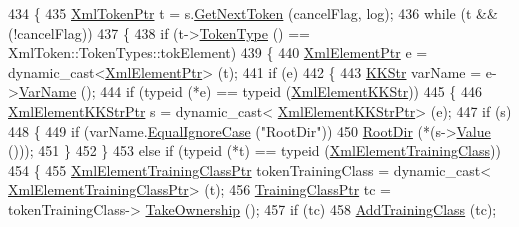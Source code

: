 \begin{DoxyCode}
434 \{
435   \hyperlink{class_k_k_b_1_1_xml_token}{XmlTokenPtr} t = s.\hyperlink{class_k_k_b_1_1_xml_stream_a87cc738b05c666cf5d5c25beaab477b4}{GetNextToken} (cancelFlag, log);
436   \textcolor{keywordflow}{while}  (t  &&  (!cancelFlag))
437   \{
438     \textcolor{keywordflow}{if}  (t->\hyperlink{class_k_k_b_1_1_xml_token_ae98e2c1a798882647578cae4adcd7176}{TokenType} () == XmlToken::TokenTypes::tokElement)
439     \{
440       \hyperlink{class_k_k_b_1_1_xml_element}{XmlElementPtr} e = \textcolor{keyword}{dynamic\_cast<}\hyperlink{class_k_k_b_1_1_xml_element}{XmlElementPtr}\textcolor{keyword}{>} (t);
441       \textcolor{keywordflow}{if}  (e)
442       \{
443         \hyperlink{class_k_k_b_1_1_k_k_str}{KKStr} varName = e->\hyperlink{class_k_k_b_1_1_xml_element_aef57cf00be66a3a387ce849b35125f51}{VarName} ();
444         \textcolor{keywordflow}{if}  (\textcolor{keyword}{typeid} (*e) == \textcolor{keyword}{typeid} (\hyperlink{class_k_k_b_1_1_xml_element_k_k_str}{XmlElementKKStr}))
445         \{
446           \hyperlink{class_k_k_b_1_1_xml_element_k_k_str}{XmlElementKKStrPtr}  s = \textcolor{keyword}{dynamic\_cast<}
      \hyperlink{class_k_k_b_1_1_xml_element_k_k_str}{XmlElementKKStrPtr}\textcolor{keyword}{>} (e);
447           \textcolor{keywordflow}{if}  (s)
448           \{
449             \textcolor{keywordflow}{if}  (varName.\hyperlink{class_k_k_b_1_1_k_k_str_a562f9696417c53f66bc4088eac072ab5}{EqualIgnoreCase} (\textcolor{stringliteral}{"RootDir"}))
450               \hyperlink{class_k_k_m_l_l_1_1_training_class_list_a816ab6c649110b7dfacb4faca256266a}{RootDir} (*(s->\hyperlink{class_k_k_b_1_1_xml_element_template_a3d671b57251b4b256fecb2197fc4a0f4}{Value} ()));
451           \}
452         \}
453         \textcolor{keywordflow}{else} \textcolor{keywordflow}{if}   (\textcolor{keyword}{typeid} (*t)  ==  \textcolor{keyword}{typeid} (\hyperlink{namespace_k_k_m_l_l_a0f118c0155cb57cdd78c2bb6e7536353}{XmlElementTrainingClass}))
454         \{
455           \hyperlink{class_k_k_b_1_1_xml_element_template}{XmlElementTrainingClassPtr} tokenTrainingClass = \textcolor{keyword}{dynamic\_cast<}
      \hyperlink{class_k_k_b_1_1_xml_element_template}{XmlElementTrainingClassPtr}\textcolor{keyword}{>} (t);
456           \hyperlink{class_k_k_m_l_l_1_1_training_class}{TrainingClassPtr}  tc = tokenTrainingClass->
      \hyperlink{class_k_k_b_1_1_xml_element_template_a1fd0ce7b0d0ee0d57fb29ca09d3ad6fc}{TakeOwnership} ();
457           \textcolor{keywordflow}{if}  (tc)
458             \hyperlink{class_k_k_m_l_l_1_1_training_class_list_a906b883f4851afe49cb6c6da66719a46}{AddTrainingClass} (tc);

\end{DoxyCode}
